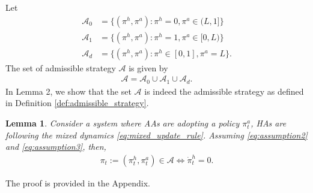 \documentclass[letterpaper]{article} %
\newtheorem{lemma}{Lemma}
\begin{document}
Let
\begin{align}
    \mathcal{A}_0&=\{(\pi^h,\pi^a):\pi^h=0,\pi^a\in(L,1]\}\label{eq:start_admissible}\\
    \mathcal{A}_1&=\{(\pi^h,\pi^a):\pi^h=1,\pi^a\in[0,L)\}\\
    \mathcal{A}_d&=\{(\pi^h,\pi^a):\pi^h\in[0,1],\pi^a=L\}.
\end{align}
The set of admissible strategy $\mathcal{A}$ is given by
\begin{align}
\label{eq:end_admissible}
    \mathcal{A}=\mathcal{A}_0\cup\mathcal{A}_1\cup\mathcal{A}_d.
\end{align}
In Lemma 2, we show that the set $\mathcal{A}$ is indeed the admissible strategy as defined in Definition \ref{def:admissible_strategy}.
\begin{lemma}
\label{lem:stop}
Consider a system where AAs are adopting a policy $\pi^a_t$, HAs are following the mixed dynamics \eqref{eq:mixed_update_rule}. Assuming \eqref{eq:assumption2} and \eqref{eq:assumption3}, then, 
\begin{align}
\label{eq:threshold_conv}
    \pi_t:=(\pi^h_t,\pi^a_t)\in\mathcal{A}\Leftrightarrow\dot{\pi}^h_t=0.
\end{align}
\end{lemma}
The proof is provided in the Appendix.
\end{document}
